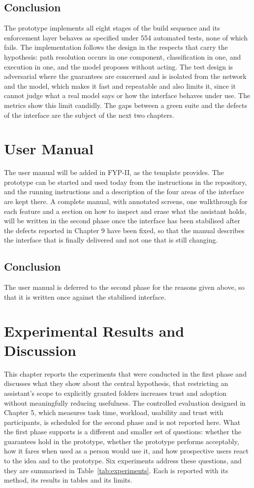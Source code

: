 \documentclass{FastFyp}
\begin{document}
\section{Conclusion}
The prototype implements all eight stages of the build sequence and its enforcement layer behaves as specified under 554 automated tests, none of which fails. The implementation follows the design in the respects that carry the hypothesis: path resolution occurs in one component, classification in one, and execution in one, and the model proposes without acting. The test design is adversarial where the guarantees are concerned and is isolated from the network and the model, which makes it fast and repeatable and also limits it, since it cannot judge what a real model says or how the interface behaves under use. The metrics show this limit candidly. The gaps between a green suite and the defects of the interface are the subject of the next two chapters.

\chapter{User Manual}
The user manual will be added in FYP-II, as the template provides. The prototype can be started and used today from the instructions in the repository, and the running instructions and a description of the four areas of the interface are kept there. A complete manual, with annotated screens, one walkthrough for each feature and a section on how to inspect and erase what the assistant holds, will be written in the second phase once the interface has been stabilised after the defects reported in Chapter 9 have been fixed, so that the manual describes the interface that is finally delivered and not one that is still changing.

\section{Conclusion}
The user manual is deferred to the second phase for the reasons given above, so that it is written once against the stabilised interface.

\chapter{Experimental Results and Discussion}
This chapter reports the experiments that were conducted in the first phase and discusses what they show about the central hypothesis, that restricting an assistant's scope to explicitly granted folders increases trust and adoption without meaningfully reducing usefulness. The controlled evaluation designed in Chapter 5, which measures task time, workload, usability and trust with participants, is scheduled for the second phase and is not reported here. What the first phase supports is a different and smaller set of questions: whether the guarantees hold in the prototype, whether the prototype performs acceptably, how it fares when used as a person would use it, and how prospective users react to the idea and to the prototype. Six experiments address these questions, and they are summarised in Table~\ref{tab:experiments}. Each is reported with its method, its results in tables and its limits.
\end{document}
